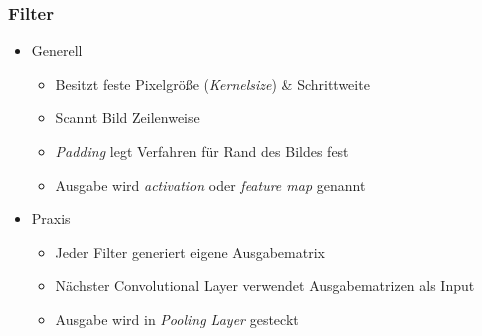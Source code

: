 \begin{frame}
\frametitle{Filter}


\begin{itemize}
\item Generell

\begin{itemize}
	\item Besitzt feste Pixelgröße (\emph{Kernelsize}) \& Schrittweite
	\item Scannt Bild Zeilenweise
	\item \emph{Padding} legt Verfahren für Rand des Bildes fest
	\item Ausgabe wird \emph{activation} oder \emph{feature map} genannt
\end{itemize}

\item Praxis
\begin{itemize}
	\item Jeder Filter generiert eigene Ausgabematrix
	\item Nächster Convolutional Layer verwendet Ausgabematrizen als Input
	\item Ausgabe wird in \emph{Pooling Layer} gesteckt
\end{itemize}

\end{itemize}




\end{frame}

